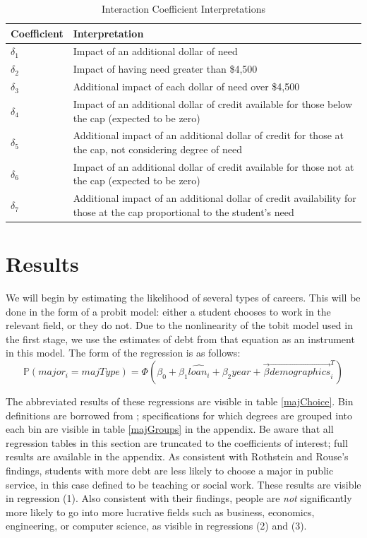 \documentclass{article}
\begin{document}
	\begin{table}
		\centering
		\caption{Interaction Coefficient Interpretations}		
		\begin{tabular}{lp{8cm}}
			\toprule
			Coefficient & Interpretation\\
			\midrule
			$\delta_1$ & Impact of an additional dollar of need\\
			$\delta_2$ & Impact of having need greater than \$4,500 \\
			$\delta_3$ & Additional impact of each dollar of need over \$4,500 \\
			$\delta_4$ & Impact of an additional dollar of credit available for those below the cap (expected to be zero)\\
			$\delta_5$ & Additional impact of an additional dollar of credit for those at the cap, not considering degree of need\\
			$\delta_6$ & Impact of an additional dollar of credit available for those not at the cap (expected to be zero)\\
			$\delta_7$ & Additional impact of an additional dollar of credit availability for those at the cap proportional to the student's need \\
			\bottomrule
		\end{tabular}
	
		\label{coefInterp}
	\end{table}
	
	
	\section{Results}
	
	We will begin by estimating the likelihood of several types of careers. This will be done in the form of a probit model: either a student chooses to work in the relevant field, or they do not. Due to the nonlinearity of the tobit model used in the first stage, we use the estimates of debt from that equation as an instrument in this model. The form of the regression is as follows: $$\mathbb{P}\left(major_i = majType\right) = \Phi\left(\beta_0 + \beta_1 \hat{loan_i} + \beta_2 year + \vec{\beta}\vec{demographics}^T_i\right)$$
	
	The abbreviated results of these regressions are visible in table \ref{majChoice}. Bin definitions are borrowed from \textcite{rothstein2011}; specifications for which degrees are grouped into each bin are visible in table \ref{majGroups} in the appendix. Be aware that all regression tables in this section are truncated to the coefficients of interest; full results are available in the appendix. As consistent with Rothstein and Rouse's findings, students with more debt are less likely to choose a major in public service, in this case defined to be teaching or social work. These results are visible in regression (1). Also consistent with their findings, people are \emph{not} significantly more likely to go into more lucrative fields such as business, economics, engineering, or computer science, as visible in regressions (2) and (3). 
\end{document}
